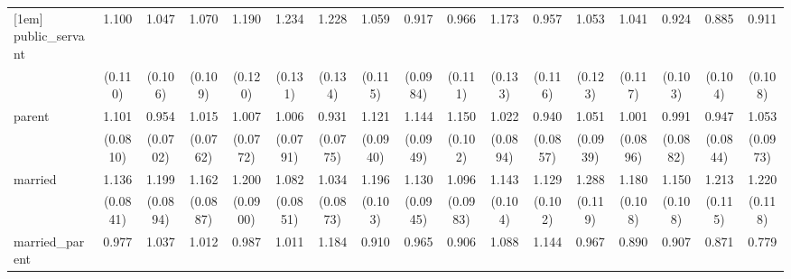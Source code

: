 {\begin{tabular}{l*{16}{c}}
[1em]
public\_servant      &       1.100         &       1.047         &       1.070         &       1.190         &       1.234\sym{*}  &       1.228         &       1.059         &       0.917         &       0.966         &       1.173         &       0.957         &       1.053         &       1.041         &       0.924         &       0.885         &       0.911         \\
                    &     (0.110)         &     (0.106)         &     (0.109)         &     (0.120)         &     (0.131)         &     (0.134)         &     (0.115)         &    (0.0984)         &     (0.111)         &     (0.133)         &     (0.116)         &     (0.123)         &     (0.117)         &     (0.103)         &     (0.104)         &     (0.108)         \\
[1em]
parent              &       1.101         &       0.954         &       1.015         &       1.007         &       1.006         &       0.931         &       1.121         &       1.144         &       1.150         &       1.022         &       0.940         &       1.051         &       1.001         &       0.991         &       0.947         &       1.053         \\
                    &    (0.0810)         &    (0.0702)         &    (0.0762)         &    (0.0772)         &    (0.0791)         &    (0.0775)         &    (0.0940)         &    (0.0949)         &     (0.102)         &    (0.0894)         &    (0.0857)         &    (0.0939)         &    (0.0896)         &    (0.0882)         &    (0.0844)         &    (0.0973)         \\
[1em]
married             &       1.136         &       1.199\sym{*}  &       1.162\sym{*}  &       1.200\sym{*}  &       1.082         &       1.034         &       1.196\sym{*}  &       1.130         &       1.096         &       1.143         &       1.129         &       1.288\sym{**} &       1.180         &       1.150         &       1.213\sym{*}  &       1.220\sym{*}  \\
                    &    (0.0841)         &    (0.0894)         &    (0.0887)         &    (0.0900)         &    (0.0851)         &    (0.0873)         &     (0.103)         &    (0.0945)         &    (0.0983)         &     (0.104)         &     (0.102)         &     (0.119)         &     (0.108)         &     (0.108)         &     (0.115)         &     (0.118)         \\
[1em]
married\_parent      &       0.977         &       1.037         &       1.012         &       0.987         &       1.011         &       1.184         &       0.910         &       0.965         &       0.906         &       1.088         &       1.144         &       0.967         &       0.890         &       0.907         &       0.871         &       0.779         \\

\end{tabular}}
